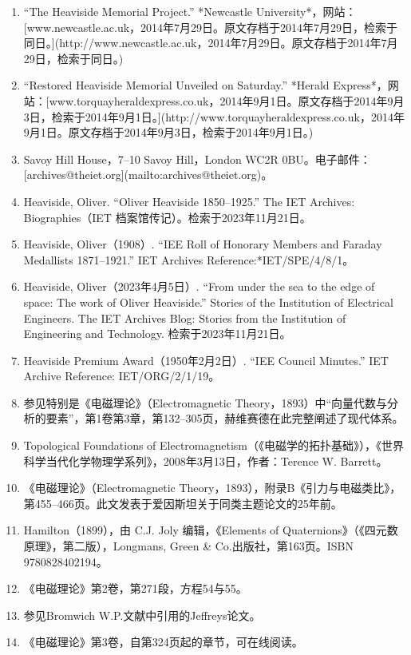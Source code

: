 \begin{enumerate}
\item “The Heaviside Memorial Project.” *Newcastle University*，网站：[www.newcastle.ac.uk，2014年7月29日。原文存档于2014年7月29日，检索于同日。](http://www.newcastle.ac.uk，2014年7月29日。原文存档于2014年7月29日，检索于同日。)

\item “Restored Heaviside Memorial Unveiled on Saturday.” *Herald Express*，网站：[www.torquayheraldexpress.co.uk，2014年9月1日。原文存档于2014年9月3日，检索于2014年9月1日。](http://www.torquayheraldexpress.co.uk，2014年9月1日。原文存档于2014年9月3日，检索于2014年9月1日。)
\item Savoy Hill House，7–10 Savoy Hill，London WC2R 0BU。电子邮件：[archives@theiet.org](mailto:archives@theiet.org)。

\item Heaviside, Oliver. “Oliver Heaviside 1850–1925.” The IET Archives: Biographies（IET 档案馆传记）。检索于2023年11月21日。
\item Heaviside, Oliver（1908）. “IEE Roll of Honorary Members and Faraday Medallists 1871–1921.” IET Archives Reference:*IET/SPE/4/8/1。
\item Heaviside, Oliver（2023年4月5日）. “From under the sea to the edge of space: The work of Oliver Heaviside.” Stories of the Institution of Electrical Engineers. The IET Archives Blog: Stories from the Institution of Engineering and Technology. 检索于2023年11月21日。
\item Heaviside Premium Award（1950年2月2日）. “IEE Council Minutes.” IET Archive Reference: IET/ORG/2/1/19。
\item 参见特别是《电磁理论》（Electromagnetic Theory，1893）中“向量代数与分析的要素”，第1卷第3章，第132–305页，赫维赛德在此完整阐述了现代体系。
\item Topological Foundations of Electromagnetism（《电磁学的拓扑基础》），《世界科学当代化学物理学系列》，2008年3月13日，作者：Terence W. Barrett。
\item 《电磁理论》（Electromagnetic Theory，1893），附录B《引力与电磁类比》，第455–466页。此文发表于爱因斯坦关于同类主题论文的25年前。
\item Hamilton（1899），由 C.J. Joly 编辑，《Elements of Quaternions》（《四元数原理》，第二版），Longmans, Green & Co.出版社，第163页。ISBN 9780828402194。
\item 《电磁理论》第2卷，第271段，方程54与55。
\item 参见Bromwich W.P.文献中引用的Jeffreys论文。
\item 《电磁理论》第3卷，自第324页起的章节，可在线阅读。

\end{enumerate}
